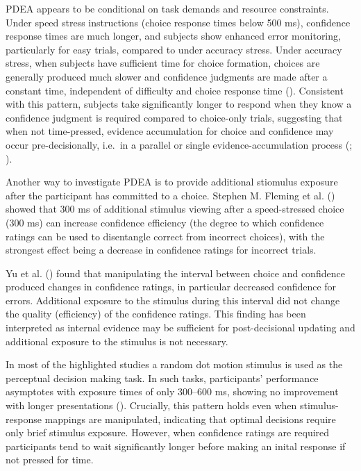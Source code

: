 \documentclass[
]{article}
\begin{document}
PDEA appears to be conditional on task demands and resource constraints.
Under speed stress instructions (choice response times below 500 ms),
confidence response times are much longer, and subjects show enhanced
error monitoring, particularly for easy trials, compared to under
accuracy stress. Under accuracy stress, when subjects have sufficient
time for choice formation, choices are generally produced much slower
and confidence judgments are made after a constant time, independent of
difficulty and choice response time
(). Consistent with this pattern, subjects take
significantly longer to respond when they know a confidence judgment is
required compared to choice-only trials, suggesting that when not
time-pressed, evidence accumulation for choice and confidence may occur
pre-decisionally, i.e.~in a parallel or single evidence-accumulation
process
(;
).

Another way to investigate PDEA is to provide additional stiomulus
exposure after the participant has committed to a choice. Stephen M.
Fleming et al.
()
showed that 300 ms of additional stimulus viewing after a speed-stressed
choice (300 ms) can increase confidence efficiency (the degree to which
confidence ratings can be used to disentangle correct from incorrect
choices), with the strongest effect being a decrease in confidence
ratings for incorrect trials.

Yu et al.
()
found that manipulating the interval between choice and confidence
produced changes in confidence ratings, in particular decreased
confidence for errors. Additional exposure to the stimulus during this
interval did not change the quality (efficiency) of the confidence
ratings. This finding has been interpreted as internal evidence may be
sufficient for post-decisional updating and additional exposure to the
stimulus is not necessary.

In most of the highlighted studies a random dot motion stimulus is used
as the perceptual decision making task. In such tasks, participants'
performance asymptotes with exposure times of only 300--600 ms, showing
no improvement with longer presentations
(). Crucially, this pattern holds even when stimulus-response
mappings are manipulated, indicating that optimal decisions require only
brief stimulus exposure. However, when confidence ratings are required
participants tend to wait significantly longer before making an inital
response if not pressed for time.
\end{document}
